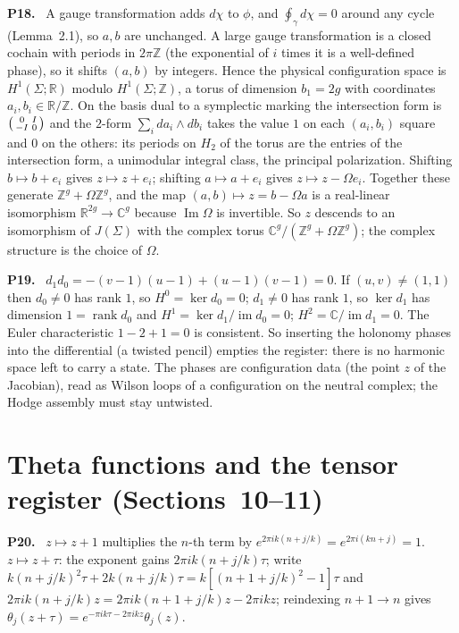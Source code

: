 \documentclass[11pt]{article}
\newcommand{\Z}{\mathbb{Z}}
\newcommand{\R}{\mathbb{R}}
\newcommand{\C}{\mathbb{C}}
\newcommand{\im}{\operatorname{im}}
\newcommand{\rank}{\operatorname{rank}}
\newenvironment{solution}[1]{\medskip\noindent\textbf{P#1.}\ }{\par\medskip}
\begin{document}
\begin{solution}{18}
A gauge transformation adds $d\chi$ to $\phi$, and $\oint_\gamma d\chi = 0$
around any cycle (Lemma~2.1), so $a,b$ are unchanged. A large gauge
transformation is a closed cochain with periods in $2\pi\Z$ (the exponential
of $i$ times it is a well-defined phase), so it shifts $(a,b)$ by integers.
Hence the physical configuration space is $H^1(\Sigma;\R)$ modulo
$H^1(\Sigma;\Z)$, a torus of dimension $b_1 = 2g$ with coordinates
$a_i,b_i\in\R/\Z$. On the basis dual to a symplectic marking the intersection
form is $\begin{psmallmatrix}0&I\\-I&0\end{psmallmatrix}$ and the $2$-form
$\sum_ida_i\wedge db_i$ takes the value $1$ on each $(a_i,b_i)$ square and $0$
on the others: its periods on $H_2$ of the torus are the entries of the
intersection form, a unimodular integral class, the principal polarization.
Shifting $b\mapsto b+e_i$ gives $z\mapsto z+e_i$; shifting $a\mapsto a+e_i$
gives $z\mapsto z-\Omega e_i$. Together these generate $\Z^g+\Omega\Z^g$, and
the map $(a,b)\mapsto z = b-\Omega a$ is a real-linear isomorphism
$\R^{2g}\to\C^g$ because $\operatorname{Im}\Omega$ is invertible. So $z$
descends to an isomorphism of $J(\Sigma)$ with the complex torus
$\C^g/(\Z^g+\Omega\Z^g)$; the complex structure is the choice of $\Omega$.
\end{solution}

\begin{solution}{19}
$d_1d_0 = -(v-1)(u-1)+(u-1)(v-1) = 0$. If $(u,v)\ne(1,1)$ then $d_0\ne0$ has
rank $1$, so $H^0 = \ker d_0 = 0$; $d_1\ne0$ has rank $1$, so $\ker d_1$ has
dimension $1 = \rank d_0$ and $H^1 = \ker d_1/\im d_0 = 0$; $H^2 = \C/\im d_1 = 0$.
The Euler characteristic $1-2+1 = 0$ is consistent. So inserting the holonomy
phases into the differential (a twisted pencil) empties the register: there is
no harmonic space left to carry a state. The phases are configuration data
(the point $z$ of the Jacobian), read as Wilson loops of a configuration on
the neutral complex; the Hodge assembly must stay untwisted.
\end{solution}

\section*{Theta functions and the tensor register (Sections~10--11)}

\begin{solution}{20}
$z\mapsto z+1$ multiplies the $n$-th term by $e^{2\pi i k(n+j/k)} = e^{2\pi i(kn+j)} = 1$.
$z\mapsto z+\tau$: the exponent gains $2\pi ik(n+j/k)\tau$; write
$k(n+j/k)^2\tau + 2k(n+j/k)\tau = k[(n+1+j/k)^2-1]\tau$ and
$2\pi ik(n+j/k)z = 2\pi ik(n+1+j/k)z - 2\pi ikz$; reindexing $n+1\to n$ gives
$\theta_j(z+\tau) = e^{-\pi ik\tau-2\pi ikz}\theta_j(z)$.
\end{solution}
\end{document}
